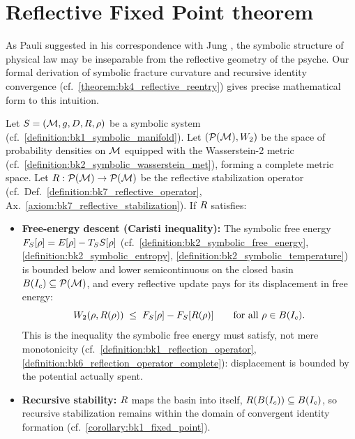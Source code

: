 \section{Reflective Fixed Point theorem}
\label{sec:bk7_reflective_fixed_point_theorem}
As Pauli suggested in his correspondence with Jung \cite{pauli1994atom}, the symbolic structure of physical law may be inseparable from the reflective geometry of the psyche. Our formal derivation of symbolic fracture curvature and recursive identity convergence (cf.~\ref{theorem:bk4_reflective_reentry}) gives precise mathematical form to this intuition.
\begin{theorem}
\label{theorem:bk7_reflective_convergence_to_stable_identity}
Let $S = (\mathcal{M}, g, D, R, \rho)$ be a symbolic system (cf.~\ref{definition:bk1_symbolic_manifold}). Let $(\mathcal{P}(\mathcal{M}), W_2)$ be the space of probability densities on $\mathcal{M}$ equipped with the Wasserstein-2 metric (cf.~\ref{definition:bk2_symbolic_wasserstein_met}), forming a complete metric space. Let $R : \mathcal{P}(\mathcal{M}) \to \mathcal{P}(\mathcal{M})$ be the reflective stabilization operator (cf.~Def.~\ref{definition:bk7_reflective_operator}, Ax.~\ref{axiom:bk7_reflective_stabilization}). If $R$ satisfies:
\begin{itemize}
    \item[(i)] \textbf{Free-energy descent (Caristi inequality):} The symbolic free energy $F_S[\rho] = E[\rho] - T_S S[\rho]$ (cf.~\ref{definition:bk2_symbolic_free_energy}, \ref{definition:bk2_symbolic_entropy}, \ref{definition:bk2_symbolic_temperature}) is bounded below and lower semicontinuous on the closed basin $B(I_c) \subseteq \mathcal{P}(\mathcal{M})$, and every reflective update pays for its displacement in free energy:
    \[
    W_2(\rho, R(\rho)) \;\leq\; F_S[\rho] - F_S[R(\rho)]
    \qquad \text{for all } \rho \in B(I_c).
    \]
    This is the inequality the symbolic free energy must satisfy, not mere monotonicity (cf.~\ref{definition:bk1_reflection_operator}, \ref{definition:bk6_reflection_operator_complete}): displacement is bounded by the potential actually spent.
    \item[(ii)] \textbf{Recursive stability:} $R$ maps the basin into itself, $R(B(I_c)) \subseteq B(I_c)$, so recursive stabilization remains within the domain of convergent identity formation (cf.~\ref{corollary:bk1_fixed_point}).
\end{itemize}

\end{theorem}

